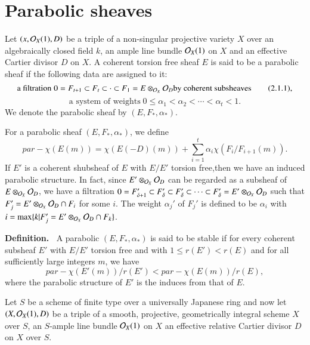 \section{Parabolic sheaves}\label{chap12-sec-2}
Let $(x, \mathcal{O}_{X}(1), D)$ be a triple of a non-singular projective variety $X$ over an algebraically closed field $k$, an ample line bundle $\mathcal{O}_{X}(1)$ on $X$ and an effective  Cartier divisor $D$ on $X$. A coherent torsion free sheaf $E$ is said to be a parabolic sheaf if the following data are assigned to it:
\begin{equation}
\text{a filtration}\; 0 = F_{t+1} \subset F_{t} \subset \cdot \subset F_{1} = E \otimes_{\mathcal{O}_{X}}\mathcal{O}_{D}
\text{by coherent subsheaves}\tag{2.1.1}\label{chap12-eq-2.1.1},
\end{equation}
\begin{equation}
\text{a system of weights} \; 0 \leq \alpha_{1} < \alpha_{2} < \cdots < \alpha_{t} < 1.\tag{2.1.2}\label{chap12-eq-2.1.2}
\end{equation}
We denote the parabolic sheaf by $(E, F_{*}, \alpha_{*})$.

For a parabolic sheaf $(E, F_{*}, \alpha_{*})$, we define
$$
par-\chi(E(m))= \chi(E(-D)(m)) + \sum\limits_{i=1}^{t} \alpha_{i}\chi(F_{i}/F_{i+1}(m)).
$$ 
If $E'$ is a coherent shubsheaf of $E$ with $E/E'$ torsion free,then we have an induced parabolic structure. In fact, since $E'\otimes_{\mathcal{O}_{X}}\mathcal{O}_{D}$ can be regarded as a subsheaf of $E\otimes_{\mathcal{O}_{X}}\mathcal{O}_{D}$, we have a filtration $0 =F_{\delta+1}' \subset F_{\delta}' \subset F_{\delta}' \subset \cdots\subset F_{\delta}'=E' \otimes_{\mathcal{O}_{X}}\mathcal{O}_{D}$ such that $F_{j}' = E'\otimes_{\mathcal{O}_{X}} \mathcal{O}_{D} \cap F_{i}$ for some $i$. The weight $\alpha_{j}'$ of $F_{j}'$ is defined to be $\alpha_{i}$ with $i=\max\{k | F_{j}' =E'\otimes_{\mathcal{O}_{X}}\mathcal{O}_{D} \cap F_{k}\}$.

\medskip
\noindent
{\bfseries {} Definition. \label{chap12-definition-2.2}}~A parabolic $(E, F_{*}, \alpha_{*})$ is said to be stable if for every coherent subsheaf $E'$ with $E/E'$ torsion free and with $1 \leq r(E')< r(E)$ and for all sufficiently large integers $m$, we have
$$
par-\chi(E'(m))/r(E') < par-\chi(E(m))/r(E),
$$
where the parabolic structure of $E'$ is the induces from that of $E$.

Let $S$ be a scheme of finite type over a universally Japanese ring and now let $(X, \mathcal{O}_{X}(1),D)$ be a triple of a smooth, projective, geometrically integral scheme $X$ over $S$, an $S$-ample line bundle $\mathcal{O}_{X}(1)$ on $X$ an effective relative Cartier divisor $D$ on $X$ over $S$.

